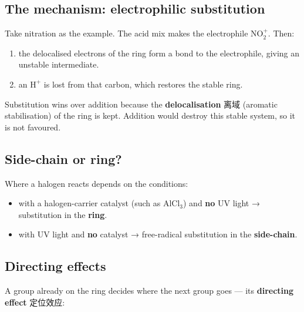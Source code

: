 \documentclass[11pt]{article}
\begin{document}
\subsection*{The mechanism: electrophilic substitution}

Take nitration as the example. The acid mix makes the electrophile $\text{NO}_2^+$. Then:

\begin{enumerate}
\item the delocalised electrons of the ring form a bond to the electrophile, giving an unstable intermediate.

\item an $\text{H}^+$ is lost from that carbon, which restores the stable ring.

\end{enumerate}

Substitution wins over addition because the \textbf{delocalisation} 离域 (aromatic stabilisation) of the ring is kept. Addition would destroy this stable system, so it is not favoured.

\subsection*{Side-chain or ring?}

Where a halogen reacts depends on the conditions:

\begin{itemize}
\item with a halogen-carrier catalyst (such as $\text{AlCl}_3$) and \textbf{no} UV light → substitution in the \textbf{ring}.

\item with UV light and \textbf{no} catalyst → free-radical substitution in the \textbf{side-chain}.

\end{itemize}

\subsection*{Directing effects}

A group already on the ring decides where the next group goes — its \textbf{directing effect} 定位效应:

\begin{center}
\end{center}
\end{document}

